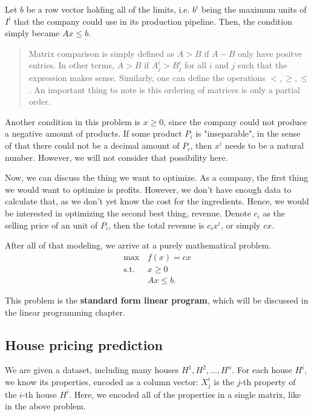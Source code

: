 Let \( b \) be a row vector holding all of the limits, i.e. \( b^{i} \) being
the maximum units of \( I^{i} \) that the company could use in its production
pipeline. Then, the condition simply became \( Ax\le b \).

\begin{quote}
  Matrix comparison is simply defined as \( A > B \) if \( A - B \) only have
  positve entries. In other terms, \( A > B \) if \( A^{i}_{j} > B^{i}_{j} \)
  for all \( i \) and \( j \) such that the expression makes sense.
  Similarly, one can define the operations \( <, \ge, \le \). An important thing
  to note is this ordering of matrices is only a partial order.
\end{quote}

Another condition in this problem is \( x \ge  0 \), since the company could not
produce a negative amount of products. If some product \( P_{i} \) is
"inseparable", in the sense of that there could not be a decimal amount of \(
P_{i} \), then \( x^{i} \) needs to be a natural number. However, we will not
consider that possibility here.

Now, we can discuss the thing we want to optimize. As a company, the first thing
we would want to optimize is profits. However, we don't have enough data to
calculate that, as we don't yet know the cost for the ingredients. Hence, we
would be interested in optimizing the second best thing, revenue. Denote \(
c_{i} \) as the selling price of an unit of \( P_{i} \), then the total revenue
is \( c_{i}x^{i} \), or simply \( cx \).

After all of that modeling, we arrive at a purely mathematical problem.
\begin{align*}
  \max\, &f(x) = cx\\
  \text{s.t.}\, &x \ge 0\\
              &Ax \le  b
.\end{align*}

This problem is the \textbf{standard form linear program}, which will be
discussed in the linear programming chapter.


\subsection{House pricing prediction} %
\label{sub:House pricing prediction}

We are given a dataset, including many houses \( H^{1}, H^{2}, \ldots, H^{n} \).
For each house \( H^{i} \), we know its properties, encoded as a column vector:
\( X^{i}_{j}\) is the \( j \)-th property of the \( i \)-th house \( H^{i} \).
Here, we encoded all of the properties in a single matrix, like in the
above problem.

